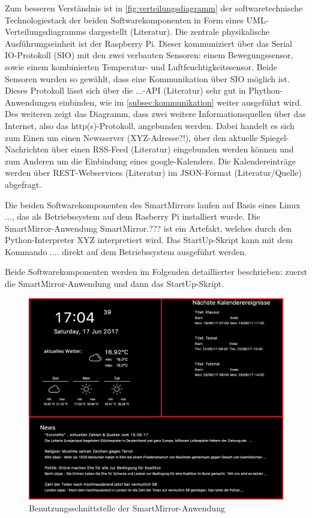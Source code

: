Zum besseren Verständnis ist in \autoref{fig:verteilungsdiagramm} der softwaretechnische Technologiestack der beiden Softwarekomponenten in Form eines UML-Verteilungsdiagramms dargestellt (Literatur). Die zentrale physikalische Ausführungseinheit ist der Raspberry Pi. Dieser kommuniziert über das Serial IO-Protokoll (SIO) mit den zwei verbauten Sensoren: einem Bewegungssensor, sowie einem kombinierten Temperatur- und Luftfeuchtigkeitssensor. Beide Sensoren wurden so gewählt, dass eine Kommunikation über SIO möglich ist. Dieses Protokoll lässt sich über die ...-API (Literatur) sehr gut in Phython-Anwendungen einbinden, wie im \autoref{subsec:kommunikation} weiter ausgeführt wird. Des weiteren zeigt das Diagramm, dass zwei weitere Informationsquellen über das Internet, also das http(s)-Protokoll, angebunden werden. Dabei handelt es sich zum Einen um  
einen Newsserver (XYZ-Adresse?!), über den aktuelle Spiegel-Nachrichten über einen RSS-Feed (Literatur) eingebunden werden können und zum Anderen um die Einbindung eines google-Kalenders. Die Kalendereinträge werden über  REST-Webservices (Literatur) im JSON-Format (Literatur/Quelle) abgefragt. 

Die beiden Softwarekomponenten des SmartMirrors laufen auf Basis eines Linux ..., das als Betriebssystem auf dem Rasberry Pi installiert wurde. Die SmartMirror-Anwendung \glqq SmartMirror.??? \grqq ist ein Artefakt, welches durch den Python-Interpreter \glqq XYZ \grqq interpretiert wird. Das StartUp-Skript kann mit dem Kommando \glqq .... \grqq direkt auf dem Betriebssystem ausgeführt werden. 

Beide Softwarekomponenten werden im Folgenden detaillierter beschrieben: zuerst die SmartMirror-Anwendung und dann das StartUp-Skript.

\begin{figure}
	\centering
	\includegraphics[width=0.7\linewidth]{bilder/grafOberflaeche}
	\caption[Benutzungsschnittstelle der SmartMirror-Anwendung]{Benutzungsschnittstelle der SmartMirror-Anwendung}
	\label{fig:grafoberflaeche}
\end{figure}


